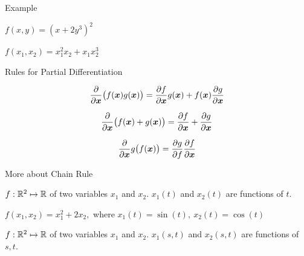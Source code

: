 \documentclass[handout,fleqn,aspectratio=169]{beamer}
\begin{document}
\begin{frame}{Example}

\plitemsep 0.2in

\bci 
\item \exam $f(x,y) = (x+2y^3)^2$

\item \exam $f(x_1, x_2) = x_1^2 x_2 + x_1 x_2^3$
\eci
\end{frame}

\begin{frame}{Rules for Partial Differentiation}

\plitemsep 0.2in

\bci 
\item {} $$\frac{\partial }{\partial \bm{x}}\big(f(\bm{x})g(\bm{x})\big) = \frac{\partial f}{\partial \bm{x}} g(\bm{x}) + f(\bm{x})\frac{\partial g}{\partial \bm{x}}$$

\item {} $$\frac{\partial }{\partial \bm{x}} \big(f(\bm{x})+ g(\bm{x})\big) = \frac{\partial f}{\partial \bm{x}} + \frac{\partial g}{\partial \bm{x}}$$

\item {} $$\frac{\partial }{\partial \bm{x}} g\big(f(\bm{x})\big) = \frac{\partial g}{\partial f}\frac{\partial f}{\partial \bm{x}}$$

\eci
\end{frame}

\begin{frame}{More about Chain Rule}

\plitemsep 0.05in

\bci 
\item $f: {\mathbb R}^2 \mapsto {\mathbb R}$ of two variables $x_1$ and $x_2.$ $x_1(t)$ and $x_2(t)$ are functions of $t.$
\item \exam $f(x_1, x_2) = x_1^2 + 2 x_2,$ where $x_1(t) = \sin(t),\ x_2(t)=\cos(t)$

\item $f: {\mathbb R}^2 \mapsto {\mathbb R}$ of two variables $x_1$ and $x_2.$ $x_1(s,t)$ and $x_2(s,t)$ are functions of $s,t.$

{
\small
\vspace{-0.2cm}
}
{
}
\eci
\end{frame}
\end{document}
